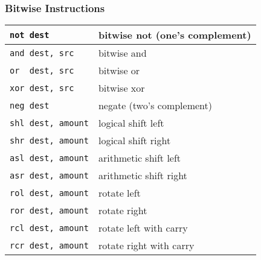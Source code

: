 \documentclass[dvipsnames]{beamer}
\begin{document}
\begin{frame}
  \frametitle{Bitwise Instructions}

  \begin{table}
    \begin{tabular}{ll}
      \lstinline|not dest|
          & bitwise not (one's complement)\\
      \hline
      \lstinline|and dest, src|
          & bitwise and\\
      \hline
      \lstinline|or  dest, src|
          & bitwise or\\
      \hline
      \lstinline|xor dest, src|
          & bitwise xor\\
      \hline
      \lstinline|neg dest|
          & negate (two's complement)\\
      \hline
      \lstinline|shl dest, amount|
          & logical shift left\\
      \hline
      \lstinline|shr dest, amount|
          & logical shift right\\
      \hline
      \lstinline|asl dest, amount|
          & arithmetic shift left\\
      \hline
      \lstinline|asr dest, amount|
          & arithmetic shift right\\
      \hline
      \lstinline|rol dest, amount|
          & rotate left\\
      \hline
      \lstinline|ror dest, amount|
          & rotate right\\
      \hline
      \lstinline|rcl dest, amount|
          & rotate left with carry\\
      \hline
      \lstinline|rcr dest, amount|
          & rotate right with carry\\
    \end{tabular}
  \end{table}
\end{frame}
\end{document}
